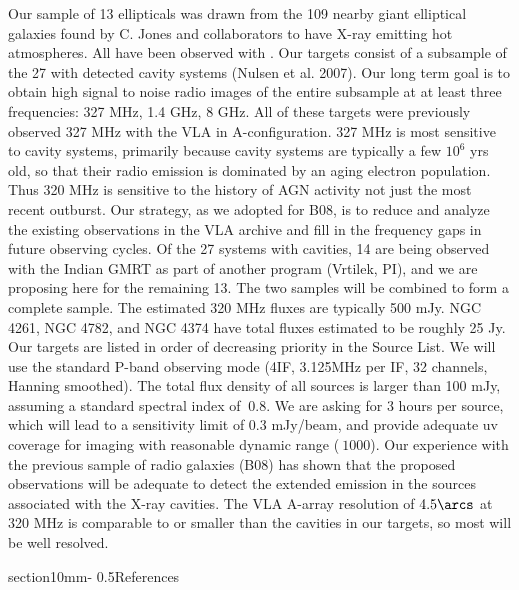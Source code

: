 \documentclass[letterpaper,11pt]{article}
\makeatletter
\renewcommand{\section}{\@startsection%
{section}{1}{0mm}{-\baselineskip}%
{0.5\baselineskip}{\normalfont\Large\bfseries}}%
\makeatother
\begin{document}
Our sample of 13 ellipticals was drawn from the 109 nearby giant
elliptical galaxies found by C. Jones and collaborators to have X-ray
emitting hot atmospheres. All have been observed with \chandra. Our
targets consist of a subsample of the 27 with detected cavity systems
(Nulsen et al. 2007). Our long term goal is to obtain high signal to
noise radio images of the entire subsample at at least three
frequencies: 327 MHz, 1.4 GHz, 8 GHz. All of these targets were
previously observed 327 MHz with the VLA in A-configuration. 327 MHz
is most sensitive to cavity systems, primarily because cavity systems
are typically a few $10^6$ yrs old, so that their radio emission is
dominated by an aging electron population. Thus 320 MHz is sensitive
to the history of AGN activity not just the most recent outburst. Our
strategy, as we adopted for B08, is to reduce and analyze the existing
observations in the VLA archive and fill in the frequency gaps in
future observing cycles. Of the 27 systems with cavities, 14 are being
observed with the Indian GMRT as part of another program (Vrtilek,
PI), and we are proposing here for the remaining 13. The two samples
will be combined to form a complete sample. The estimated 320 MHz
fluxes are typically 500 mJy. NGC 4261, NGC 4782, and NGC 4374 have
total fluxes estimated to be roughly 25 Jy. Our targets are listed in
order of decreasing priority in the Source List. We will use the
standard P-band observing mode (4IF, 3.125MHz per IF, 32 channels,
Hanning smoothed). The total flux density of all sources is larger
than 100 mJy, assuming a standard spectral index of $~0.8$. We are
asking for 3 hours per source, which will lead to a sensitivity limit
of 0.3 mJy/beam, and provide adequate uv coverage for imaging with
reasonable dynamic range ($~1000$). Our experience with the previous
sample of radio galaxies (B08) has shown that the proposed
observations will be adequate to detect the extended emission in the
sources associated with the X-ray cavities. The VLA A-array resolution
of $4.5\arcs$ at 320 MHz is comparable to or smaller than the cavities
in our targets, so most will be well resolved.

\section{References}
\end{document}
